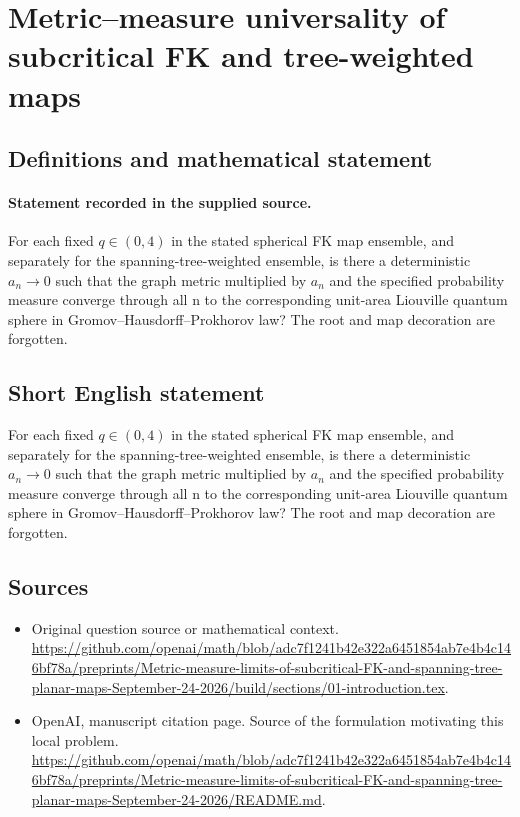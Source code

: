 \documentclass[11pt]{article}
\begin{document}
\section*{Metric–measure universality of subcritical FK and tree-weighted maps}\label{30007351}
\subsection{Definitions and mathematical statement}
\paragraph{Statement recorded in the supplied source.}
For each fixed $q\in (0,4)$ in the stated spherical FK map ensemble, and separately for the spanning-tree-weighted ensemble, is there a deterministic $a_n\to 0$ such that the graph metric multiplied by $a_n$ and the specified probability measure converge through all n to the corresponding unit-area Liouville quantum sphere in Gromov–Hausdorff–Prokhorov law? The root and map decoration are forgotten.
\subsection{Short English statement}
For each fixed $q\in (0,4)$ in the stated spherical FK map ensemble, and separately for the spanning-tree-weighted ensemble, is there a deterministic $a_n\to 0$ such that the graph metric multiplied by $a_n$ and the specified probability measure converge through all n to the corresponding unit-area Liouville quantum sphere in Gromov–Hausdorff–Prokhorov law? The root and map decoration are forgotten.
\subsection{Sources}
\begin{itemize}
\item[S1] Original question source or mathematical context.
\url{https://github.com/openai/math/blob/adc7f1241b42e322a6451854ab7e4b4c146bf78a/preprints/Metric-measure-limits-of-subcritical-FK-and-spanning-tree-planar-maps-September-24-2026/build/sections/01-introduction.tex}.
\item[S2] OpenAI, manuscript citation page. Source of the formulation motivating this local problem.
\url{https://github.com/openai/math/blob/adc7f1241b42e322a6451854ab7e4b4c146bf78a/preprints/Metric-measure-limits-of-subcritical-FK-and-spanning-tree-planar-maps-September-24-2026/README.md}.
\end{itemize}
\end{document}
